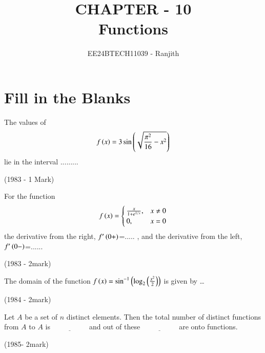 \documentclass[journal]{IEEEtran}
\begin{document}

\onecolumn

\title{CHAPTER - 10\\Functions}
\author{EE24BTECH11039 - Ranjith}
\maketitle


\renewcommand{\thefigure}{\theenumi}
\renewcommand{\thetable}{\theenumi}


\section{ Fill in the Blanks}


\begin{enumerate}
    \item The values of \begin{align*}f\left(x\right)=3\sin\left(\sqrt{\frac{\pi^2}{16}-x^2}\right)\end{align*}lie in the interval .........
    
    
    \hfill{(1983 - 1 Mark)}
    
    
     \item For the function \begin{align*}f\left(x\right) = \begin{cases} \frac{x}{1 + e^{1/x}}, & x \neq 0 \\ 0, & x = 0 \end{cases} \end{align*}
    the derivative from the right, $f^{\prime}\left(0+\right) $=..... , and the derivative from the left, $f^{\prime }\left(0-\right)$=......
    
    
     
    \hfill{(1983 - 2mark)}
    
    \item{The domain of the function $f\left(x\right)=\sin^{-1}\left(\log_{2}\left(\frac{x^{2}}{2}\right)\right)$ is given by \ldots \
    
    
    \hfill 
    {(1984 - 2mark)}
    
    \item Let \( A \) be a set of \( n \) distinct elements. Then the total number of distinct functions from \( A \) to \( A \) is \( \underline{\hspace{2cm}} \) and out of these \( \underline{\hspace{2cm}} \) are onto functions.
    
    \hfill
    {(1985- 2mark)}
    
}
\end{enumerate}
\end{document}
